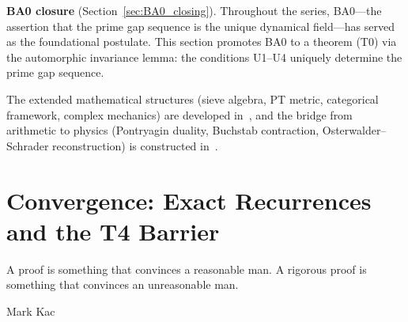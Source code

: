\documentclass[12pt,a4paper]{article}
\begin{document}
\textbf{BA0 closure} (Section~\ref{sec:BA0_closing}).  Throughout the
series, BA0---the assertion that the prime gap sequence is the unique
dynamical field---has served as the foundational postulate.  This
section promotes BA0 to a theorem (T0) via the automorphic invariance
lemma: the conditions U1--U4 uniquely determine the prime gap sequence.

The extended mathematical structures (sieve algebra, PT metric,
categorical framework, complex mechanics) are developed
in~\cite{companion_M4}, and the bridge from arithmetic to physics
(Pontryagin duality, Buchstab contraction, Osterwalder--Schrader
reconstruction) is constructed in~\cite{companion_M5}.


\newpage


\section{Convergence: Exact Recurrences and the T4 Barrier}
\label{sec:convergence}

\epigraph{A proof is something that convinces a reasonable man. A
rigorous proof is something that convinces an unreasonable man.}{Mark
Kac}
\end{document}
